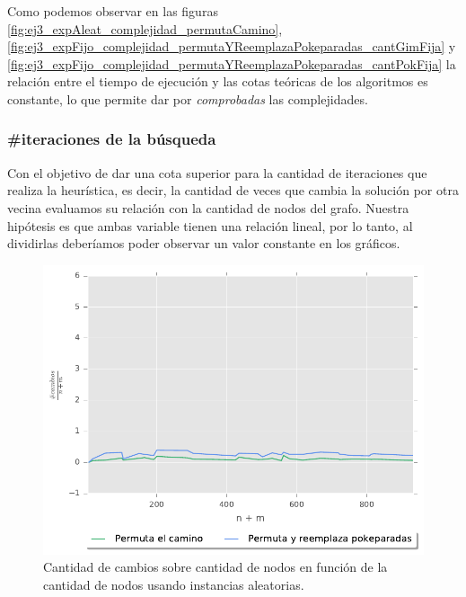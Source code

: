 Como podemos observar en las figuras \ref{fig:ej3_expAleat_complejidad_permutaCamino}, \ref{fig:ej3_expFijo_complejidad_permutaYReemplazaPokeparadas_cantGimFija} y \ref{fig:ej3_expFijo_complejidad_permutaYReemplazaPokeparadas_cantPokFija} la relaci\'on entre el tiempo de ejecuci\'on y las cotas te\'oricas de los algoritmos es constante, lo que permite dar por \textit{comprobadas} las complejidades.

\subsubsection{\#iteraciones de la b\'usqueda}

Con el objetivo de dar una cota superior para la cantidad de iteraciones que realiza la heur\'istica, es decir, la cantidad de veces que cambia la soluci\'on por otra vecina evaluamos su relaci\'on con la cantidad de nodos del grafo. Nuestra hip\'otesis es que ambas variable tienen una relaci\'on lineal, por lo tanto, al dividirlas deber\'iamos poder observar un valor constante en los gr\'aficos.

\begin{figure}[H]
  \begin{center}
    \includegraphics{../experimentacion/ej3/expAleat_cantCambios.pdf}
    \caption{Cantidad de cambios sobre cantidad de nodos en funci\'on de la cantidad de nodos usando instancias aleatorias.}
    \label{fig:ej3_expAleat_cantCambios}
  \end{center}
\end{figure}

